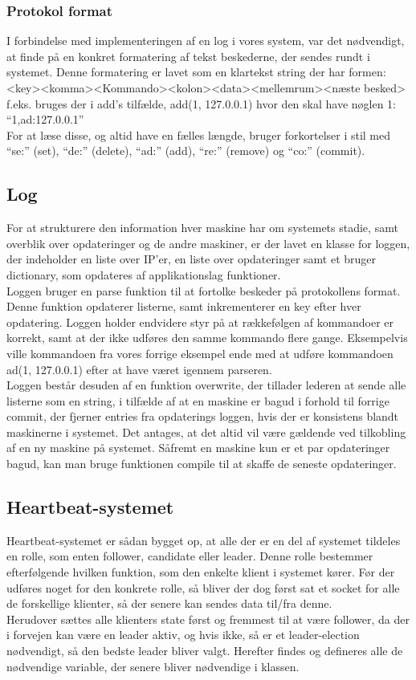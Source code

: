 \documentclass[a4paper,12pt]{article}
\begin{document}
\subsubsection{Protokol format}
I forbindelse med implementeringen af en log i vores system, var det nødvendigt, at finde på en konkret formatering af tekst beskederne, der sendes rundt i systemet.
Denne formatering er lavet som en klartekst string der har formen:
<key><komma><Kommando><kolon><data><mellemrum><næste besked>
f.eks. bruges der i add’s tilfælde, add(1, 127.0.0.1) hvor den skal have nøglen 1: 
“1,ad:127.0.0.1”
\\
For at læse disse, og altid have en fælles længde, bruger forkortelser i stil med “se:” (set), “de:” (delete), “ad:” (add), “re:” (remove) og “co:” (commit). 


\subsection{Log}
For at strukturere den information hver maskine har om systemets stadie, samt overblik over opdateringer og de andre maskiner, er der lavet en klasse for loggen, der indeholder en liste over IP’er, en liste over opdateringer samt et bruger dictionary, som opdateres af applikationslag funktioner.
\\
Loggen bruger en parse funktion til at fortolke beskeder på protokollens format. 
Denne funktion opdaterer listerne, samt inkrementerer en key efter hver opdatering. Loggen holder endvidere styr på at rækkefølgen af kommandoer er korrekt, samt at der ikke udføres den samme kommando flere gange.
Eksempelvis ville kommandoen fra vores forrige eksempel ende med at udføre kommandoen ad(1, 127.0.0.1) efter at have været igennem parseren.
\\
Loggen består desuden af en funktion overwrite, der tillader lederen at sende alle listerne som en string, i tilfælde af at en maskine er bagud i forhold til forrige commit, der fjerner entries fra opdaterings loggen, hvis der er konsistens blandt maskinerne i systemet. Det antages, at det altid vil være gældende ved tilkobling af en ny maskine på systemet.
Såfremt en maskine kun er et par opdateringer bagud, kan man bruge funktionen compile til at skaffe de seneste opdateringer.


\subsection{Heartbeat-systemet}
Heartbeat-systemet er sådan bygget op, at alle der er en del af systemet tildeles en rolle, som enten follower, candidate eller leader. Denne rolle bestemmer efterfølgende hvilken funktion, som den enkelte klient i systemet kører.
Før der udføres noget for den konkrete rolle, så bliver der dog først sat et socket for alle de forskellige klienter, så der senere kan sendes data til/fra denne.
\\
Herudover sættes alle klienters state først og fremmest til at være follower, da der i forvejen kan være en leader aktiv, og hvis ikke, så er et leader-election nødvendigt, så den bedste leader bliver valgt.
Herefter findes og defineres alle de nødvendige variable, der senere bliver nødvendige i klassen.
\end{document}
